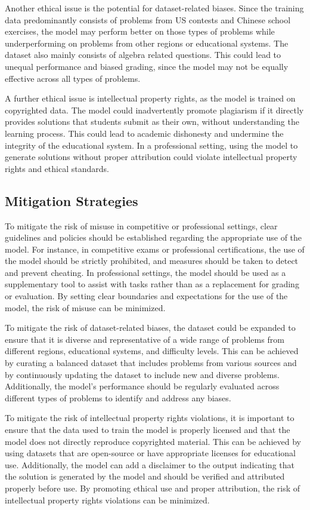 \documentclass{article}
\begin{document}
Another ethical issue is the potential for dataset-related biases. Since the training data predominantly consists of problems from US contests and Chinese school exercises, the model may perform better on those types of problems while underperforming on problems from other regions or educational systems. The dataset also mainly consists of algebra related questions. This could lead to unequal performance and biased grading, since the model may not be equally effective across all types of problems. 

A further ethical issue is intellectual property rights, as the model is trained on copyrighted data. The model could inadvertently promote plagiarism if it directly provides solutions that students submit as their own, without understanding the learning process. This could lead to academic dishonesty and undermine the integrity of the educational system. In a professional setting, using the model to generate solutions without proper attribution could violate intellectual property rights and ethical standards.

\subsection{Mitigation Strategies}
To mitigate the risk of misuse in competitive or professional settings, clear guidelines and policies should be established regarding the appropriate use of the model. For instance, in competitive exams or professional certifications, the use of the model should be strictly prohibited, and measures should be taken to detect and prevent cheating. In professional settings, the model should be used as a supplementary tool to assist with tasks rather than as a replacement for grading or evaluation. By setting clear boundaries and expectations for the use of the model, the risk of misuse can be minimized.

To mitigate the risk of dataset-related biases, the dataset could be expanded to ensure that it is diverse and representative of a wide range of problems from different regions, educational systems, and difficulty levels. This can be achieved by curating a balanced dataset that includes problems from various sources and by continuously updating the dataset to include new and diverse problems. Additionally, the model's performance should be regularly evaluated across different types of problems to identify and address any biases.

To mitigate the risk of intellectual property rights violations, it is important to ensure that the data used to train the model is properly licensed and that the model does not directly reproduce copyrighted material. This can be achieved by using datasets that are open-source or have appropriate licenses for educational use. Additionally, the model can add a disclaimer to the output indicating that the solution is generated by the model and should be verified and attributed properly before use. By promoting ethical use and proper attribution, the risk of intellectual property rights violations can be minimized.
\end{document}
